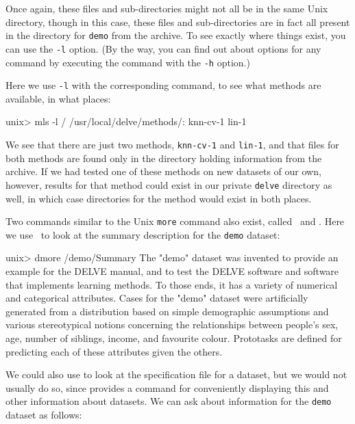 Once again, these files and sub-directories might not all be in the
same Unix directory, though in this case, these files and
sub-directories are in fact all present in the directory for
\texttt{demo} from the \delve{} archive.  To see exactly where things
exist, you can use the \texttt{-l} option.  (By the way, you can find
out about options for any \delve{} command by executing the command
with the \texttt{-h} option.)

Here we use \texttt{-l} with the corresponding \mls{} command, to see
what methods are available, in what places:

\begin{Session}
unix> mls -l /
/usr/local/delve/methods/:
knn-cv-1 lin-1
\end{Session}

We see that there are just two methods, \texttt{knn-cv-1} and
\texttt{lin-1}, and that files for both methods are found only in the
directory holding information from the \delve{} archive.  If we had
tested one of these methods on new datasets of our own, however,
results for that method could exist in our private \texttt{delve}
directory as well, in which case directories for the method would
exist in both places.

Two \delve{} commands similar to the Unix \texttt{more} command also
exist, called \dmore\ and \mmore.  Here we use \dmore\ to look at the
summary description for the \texttt{demo} dataset:

\begin{Session}
unix> dmore /demo/Summary
The "demo" dataset was invented to provide an example for the DELVE
manual, and to test the DELVE software and software that implements
learning methods.  To those ends, it has a variety of numerical and
categorical attributes.  Cases for the "demo" dataset were artificially 
generated from a distribution based on simple demographic assumptions
and various stereotypical notions concerning the relationships between
people's sex, age, number of siblings, income, and favourite colour.
Prototasks are defined for predicting each of these attributes given
the others.
\end{Session}

We could also use \dmore{} to look at the specification file for a
dataset, but we would not usually do so, since \delve{} provides a
command \dinfo{} for conveniently displaying this and other
information about datasets.  We can ask about information for the
\texttt{demo} dataset as follows:

